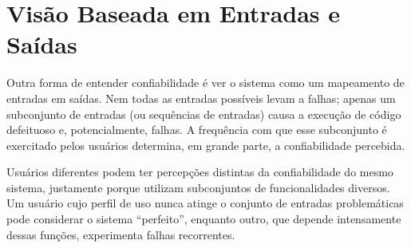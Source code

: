 \documentclass[12pt,a4paper,twoside]{report}
\begin{document}
\section{Visão Baseada em Entradas e Saídas}

Outra forma de entender confiabilidade é ver o sistema como um mapeamento de
entradas em saídas. Nem todas as entradas possíveis levam a falhas; apenas
um subconjunto de entradas (ou sequências de entradas) causa a execução de
código defeituoso e, potencialmente, falhas. A frequência com que esse
subconjunto é exercitado pelos usuários determina, em grande parte, a
confiabilidade percebida.

Usuários diferentes podem ter percepções distintas da confiabilidade do
mesmo sistema, justamente porque utilizam subconjuntos de funcionalidades
diversos. Um usuário cujo perfil de uso nunca atinge o conjunto de entradas
problemáticas pode considerar o sistema ``perfeito'', enquanto outro, que
depende intensamente dessas funções, experimenta falhas recorrentes.
\end{document}
